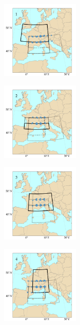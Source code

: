 \documentclass[twocol]{ametsoc}
\begin{document}
\begin{figure}[htb]
	\centering
	\begin{subfigure}{.5\columnwidth}
		\centering
		\includegraphics[width=3.9cm]{figures/spatial_win_z4-hi4/Spatial_windows_1.png}
	\end{subfigure}%
	\begin{subfigure}{.5\columnwidth}
		\centering
		\includegraphics[width=3.9cm]{figures/spatial_win_z4-hi4/Spatial_windows_2.png}
	\end{subfigure}
	\begin{subfigure}{.5\columnwidth}
		\centering
		\includegraphics[width=3.9cm]{figures/spatial_win_z4-hi4/Spatial_windows_3.png}
	\end{subfigure}%
	\begin{subfigure}{.5\columnwidth}
		\centering
		\includegraphics[width=3.9cm]{figures/spatial_win_z4-hi4/Spatial_windows_4.png}
	\end{subfigure}

\end{figure}
\end{document}
